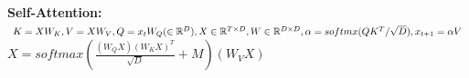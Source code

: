 \textbf{Self-Attention:} $K=XW_K, V=XW_V, Q=x_{t}W_Q (\in \mathbb{R}^{D}),\\ 
X\in \mathbb{R}^{T\times D}, W\in \mathbb{R}^{D\times D}, \alpha = softmx(QK^T/\sqrt{D}), x_{t+1} = \alpha V$\\
$X = softmax(\frac{(W_QX)(W_KX)^T}{\sqrt{D}} + M) (W_VX)$\\

